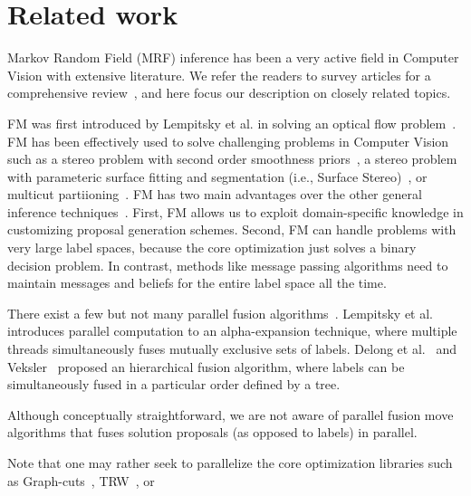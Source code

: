 \section{Related work}


Markov Random Field (MRF) inference has been a very active field in
Computer Vision with extensive literature. We refer the readers to
survey articles for a comprehensive
review~\cite{middlebury_mrf,comparative_study_of_modern_inference}, and
here focus our description on closely related topics.


\noindent FM was first introduced by Lempitsky et al. in solving an
optical flow problem~\cite{first_fusion_viktor}. FM has been effectively
used to solve challenging problems in Computer Vision such as a stereo
problem with second order smoothness priors~\cite{woodford}, a stereo
problem with parameteric surface fitting and segmentation (i.e., Surface
Stereo)~\cite{surface_stereo}, or multicut
partiioning~\cite{fusionmovesforcorrelationclustering}.
%
FM has two main advantages over the other general inference
techniques~\cite{trw,loopy_belief_propagation}.  First, FM allows us to exploit
domain-specific knowledge in customizing proposal generation
schemes. Second, FM can handle problems with very large label spaces,
because the core optimization just solves a binary decision problem. In
contrast, methods like message passing algorithms need to maintain
messages and beliefs for the entire label space all the time.



\noindent There exist a few but not many parallel fusion
algorithms~\cite{viktor,olga,delong}. Lempitsky et al. introduces
parallel computation to an alpha-expansion technique, where multiple
threads simultaneously fuses mutually exclusive sets of labels. Delong
et al.~\cite{delong} and Veksler~\cite{olga} proposed an hierarchical
fusion algorithm, where labels can be simultaneously fused in a
particular order defined by a tree.
 




Although conceptually straightforward, we are not aware of parallel
fusion move algorithms that fuses solution proposals (as opposed to
labels) in parallel.
 
Note that one may rather seek to parallelize the core optimization
libraries such as Graph-cuts~\cite{}, TRW~\cite{kolmogorov}, or

